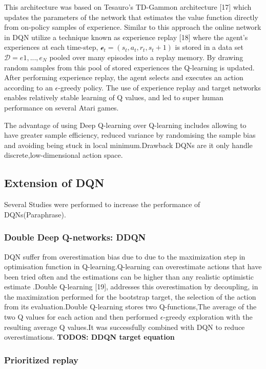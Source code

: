 This architecture was based on Tesauro’s TD-Gammon architecture [17]
which updates the parameters of the network that estimates the value function 
directly from on-policy samples of experience. 
Similar to this approach the online network  in DQN utilize a 
technique known as experience replay [18] where the 
agent’s experiences at each time-step, 
$\mathcal e_t = (s_t,a_t,r_t,s_t+1)$ is stored in a data set 
$\mathcal D = e1 , ..., e_N $ pooled over many 
episodes into a replay memory.
By drawing random samples from this pool of stored experiences  the Q-learning is updated.
After performing experience replay, the agent selects and executes an 
action according to an $\epsilon$-greedy policy.
The use of experience replay and target networks enables 
relatively stable learning of Q values, 
and led to super human performance on several Atari games.

The advantage of using Deep Q-learning over Q-learning  
includes allowing  to have greater sample efficiency,
reduced variance by randomising the sample bias and avoiding being 
stuck in local minimum.Drawback  
DQNs are it only handle discrete,low-dimensional action space.


\subsection{Extension of DQN }

Several Studies were performed to increase the performance of DQNs(Paraphrase).

\subsubsection{Double Deep Q-networks: DDQN}

DQN suffer from overestimation bias due to due to the maximization step in optimisation function in Q-learning.Q-learning can overestimate actions that have been tried often and the estimations can be higher than any realistic optimistic estimate .Double Q-learning [19], addresses this overestimation by decoupling, in the maximization performed for the bootstrap target, the selection of the action from its evaluation.Double Q-learning stores two Q-functions,The average of the two Q values for each action and then performed $\mathcal{\epsilon}$-greedy exploration with the resulting average Q values.It was successfully combined with DQN to reduce  overestimations.\textbf{ TODOS: DDQN  target equation}

\subsubsection{Prioritized replay}

